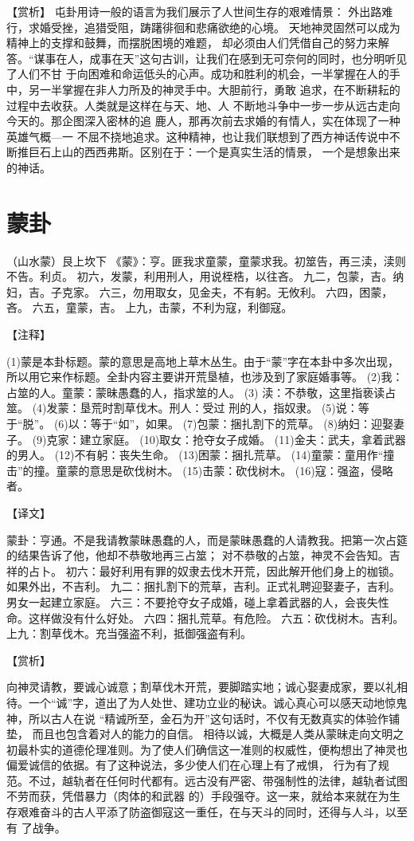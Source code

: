 \documentclass[a4paper,12pt,UTF8,twoside]{ctexbook}
\begin{document}
【赏析】
屯卦用诗一般的语言为我们展示了人世间生存的艰难情景： 外出路难行，求婚受挫，追猎受阻，踌躇徘徊和悲痛欲绝的心境。 天地神灵固然可以成为精神上的支撑和鼓舞，而摆脱困境的难题， 却必须由人们凭借自己的努力来解答。“谋事在人，成事在天”这句古训，让我们在感到无可奈何的同时，也分明听见了人们不甘 于向困难和命运低头的心声。成功和胜利的机会，一半掌握在人的手中，另一半掌握在非人力所及的神灵手中。大胆前行，勇敢 追求，在不断耕耘的过程中去收获。人类就是这样在与天、地、人 不断地斗争中一步一步从远古走向今天的。那企图深入密林的追 鹿人，那再次前去求婚的有情人，实在体现了一种英雄气概—一 不屈不挠地追求。这种精神，也让我们联想到了西方神话传说中不断推巨石上山的西西弗斯。区别在于：一个是真实生活的情景， 一个是想象出来的神话。 

\chapter{蒙卦}

（山水蒙）艮上坎下
《蒙》：亨。匪我求童蒙，童蒙求我。初筮告，再三渎，渎则不告。利贞。
初六，发蒙，利用刑人，用说桎梏，以往吝。
九二，包蒙，吉。纳妇，吉。子克家。
六三，勿用取女，见金夫，不有躬。无攸利。
六四，困蒙，吝。
六五，童蒙，吉。
上九，击蒙，不利为寇，利御寇。

【注释】

(1)蒙是本卦标题。蒙的意思是高地上草木丛生。由于“蒙”字在本卦中多次出现，所以用它来作标题。全卦内容主要讲开荒垦植，也涉及到了家庭婚事等。
(2)我：占筮的人。童蒙：蒙昧愚蠢的人，指求筮的人。
(3) 渎：不恭敬，这里指亵读占筮。
(4)发蒙：垦荒时割草伐木。刑人：受过 刑的人，指奴隶。
(5)说：等于“脱”。
(6)以：等于“如”，如果。
(7)包蒙：捆扎割下的荒草。
(8)纳妇：迎娶妻子。
(9)克家：建立家庭。
(10)取女：抢夺女子成婚。
(11)金夫：武夫，拿着武器的男人。
(12)不有躬：丧失生命。
(13)困蒙：捆扎荒草。
(14)童蒙：童用作“撞击”的撞。童蒙的意思是砍伐树木。
(15)击蒙：砍伐树木。
(16)寇：强盗，侵略者。

【译文】

蒙卦：亨通。不是我请教蒙昧愚蠢的人，而是蒙昧愚蠢的人请教我。把第一次占筵的结果告诉了他，他却不恭敬地再三占筮； 对不恭敬的占筮，神灵不会告知。吉祥的占卜。
初六：最好利用有罪的奴隶去伐木开荒，因此解开他们身上的枷锁。如果外出，不吉利。
九二：捆扎割下的荒草，吉利。正式礼聘迎娶妻子，吉利。男女一起建立家庭。
六三：不要抢夺女子成婚，碰上拿着武器的人，会丧失性命。这样做没有什么好处。
六四：捆扎荒草。有危险。
六五：砍伐树木。吉利。
上九：割草伐木。充当强盗不利，抵御强盗有利。

【赏析】

向神灵请教，要诚心诚意；割草伐木开荒，要脚踏实地；诚心娶妻成家，要以礼相待。一个“诚”字，道出了为人处世、建功立业的秘诀。诚心真心可以感天动地惊鬼神，所以古人在说 “精诚所至，金石为开”这句话时，不仅有无数真实的体验作铺垫， 而且也包含着对人的能力的自信。 相待以诚，大概是人类从蒙昧走向文明之初最朴实的道德伦理准则。为了使人们确信这一准则的权威性，便构想出了神灵也 偏爱诚信的依据。有了这种说法，多少使人们在心理上有了戒惧， 行为有了规范。不过，越轨者在任何时代都有。远古没有严密、带强制性的法律，越轨者试图不劳而获，凭借暴力（肉体的和武器 的）手段强夺。这一来，就给本来就在为生存艰难奋斗的古人平添了防盗御寇这一重任，在与天斗的同时，还得与人斗，以至有 了战争。
\end{document}
